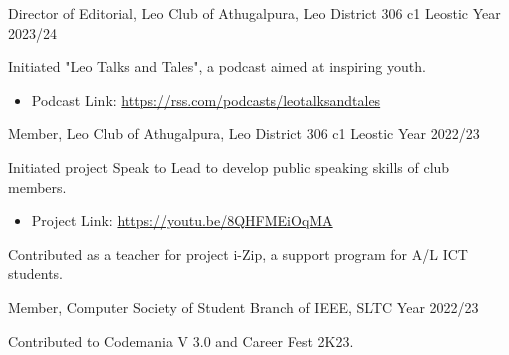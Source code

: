 

\begin{cventries}

  \cventry
    {Director of Editorial, Leo Club of Athugalpura, Leo District 306 c1} %
    {} %
    {} %
    {Leostic Year 2023/24} %
    {
      \begin{cvitems} %
        \item {Initiated "Leo Talks and Tales", a podcast aimed at inspiring youth.}
        \begin{itemize}
            \item {Podcast Link: \url{https://rss.com/podcasts/leotalksandtales}}
        \end{itemize}
      \end{cvitems}
    }

  \cventry
    {Member, Leo Club of Athugalpura, Leo District 306 c1} %
    {} %
    {} %
    {Leostic Year 2022/23} %
    {
      \begin{cvitems} %
        \item {Initiated project Speak to Lead to develop public speaking skills of club members.}
        \begin{itemize}
            \item {Project Link: \url{https://youtu.be/8QHFMEiOqMA}}
        \end{itemize}
        \item {Contributed as a teacher for project i-Zip, a support program for A/L ICT students.}
      \end{cvitems}
    }

  \cventry
    {Member, Computer Society of Student Branch of IEEE, SLTC} %
    {} %
    {} %
    {Year 2022/23} %
    {
      \begin{cvitems} %
        \item {Contributed to Codemania V 3.0 and Career Fest 2K23.}
      \end{cvitems}
    }


\end{cventries}
